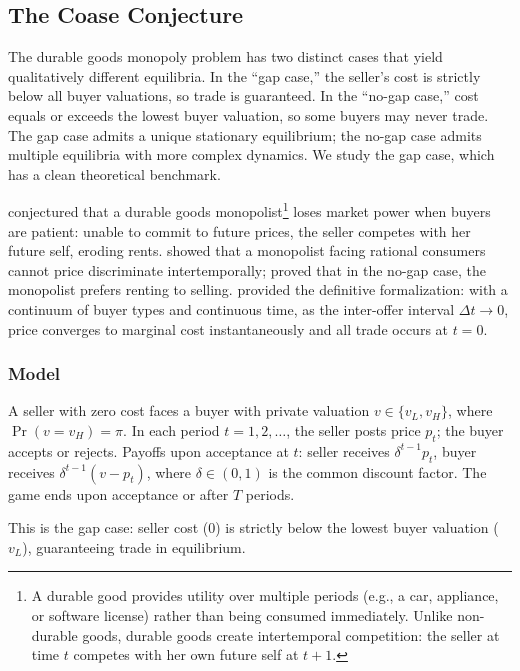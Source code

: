\subsection{The Coase Conjecture}

The durable goods monopoly problem has two distinct cases that yield qualitatively different equilibria. In the ``gap case,'' the seller's cost is strictly below all buyer valuations, so trade is guaranteed. In the ``no-gap case,'' cost equals or exceeds the lowest buyer valuation, so some buyers may never trade. The gap case admits a unique stationary equilibrium; the no-gap case admits multiple equilibria with more complex dynamics. We study the gap case, which has a clean theoretical benchmark.

\citet{coase1972durability} conjectured that a durable goods monopolist\footnote{A durable good provides utility over multiple periods (e.g., a car, appliance, or software license) rather than being consumed immediately. Unlike non-durable goods, durable goods create intertemporal competition: the seller at time $t$ competes with her own future self at $t+1$.} loses market power when buyers are patient: unable to commit to future prices, the seller competes with her future self, eroding rents. \citet{stokey1981rational} showed that a monopolist facing rational consumers cannot price discriminate intertemporally; \citet{bulow1982durable} proved that in the no-gap case, the monopolist prefers renting to selling. \citet{gul1986foundations} provided the definitive formalization: with a continuum of buyer types and continuous time, as the inter-offer interval $\Delta t \to 0$, price converges to marginal cost instantaneously and all trade occurs at $t = 0$.

\subsubsection{Model}

A seller with zero cost faces a buyer with private valuation $v \in \{v_L, v_H\}$, where $\Pr(v = v_H) = \pi$. In each period $t = 1, 2, \ldots$, the seller posts price $p_t$; the buyer accepts or rejects. Payoffs upon acceptance at $t$: seller receives $\delta^{t-1} p_t$, buyer receives $\delta^{t-1}(v - p_t)$, where $\delta \in (0,1)$ is the common discount factor. The game ends upon acceptance or after $T$ periods.

This is the gap case: seller cost (0) is strictly below the lowest buyer valuation ($v_L$), guaranteeing trade in equilibrium.

